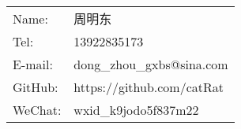 \begin{tabular}{ll}
  Name: & 周明东 \\
  Tel: & 13922835173 \\
  E-mail: & dong\_zhou\_gxbs@sina.com \\
  GitHub: & https://github.com/catRat \\
  WeChat: & wxid_k9jodo5f837m22
\end{tabular}
